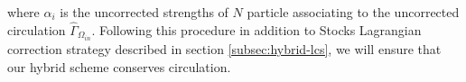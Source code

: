 	where $\alpha_i$ is the uncorrected strengths of $N$ particle associating to the uncorrected circulation $\hat{\Gamma}_{\Omega_{in}}$. Following this procedure in addition to Stocks Lagrangian correction strategy described in section \ref{subsec:hybrid-lcs}, we will ensure that our hybrid scheme conserves circulation.
	
%	
%		
%	
%
%	
%
%	
%
%	
